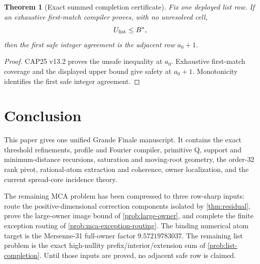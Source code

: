 \documentclass[11pt,a4paper]{amsart}
\numberwithin{equation}{section}
\newtheorem{theorem}{Theorem}[section]
\theoremstyle{remark}
\begin{document}
\begin{theorem}[Exact summed completion certificate]\label{thm:exact-completion-certificate}
Fix one deployed list row.  If an exhaustive first-match compiler proves, with no unresolved cell,
\[
 U_{\rm list}\le B^*,
\]
then the first safe integer agreement is the adjacent row $a_0+1$.
\end{theorem}

\begin{proof}
CAP25 v13.2 proves the unsafe inequality at $a_0$.  Exhaustive first-match coverage and the displayed upper bound give safety at $a_0+1$.  Monotonicity identifies the first safe integer agreement.
\end{proof}

\section{Conclusion}\label{sec:conclusion}
This paper gives one unified Grande Finale manuscript.  It contains the exact threshold refinements, profile and Fourier compiler, primitive Q, support and minimum-distance recursions, saturation and moving-root geometry, the order-$32$ rank pivot, rational-atom extraction and coherence, owner localization, and the current spread-core incidence theory.

The remaining MCA problem has been compressed to three row-sharp inputs: route the positive-dimensional correction components isolated by \cref{thm:residual}, prove the large-owner image bound of \cref{prob:large-owner}, and complete the finite exception routing of \cref{prob:mca-exception-routing}.  The binding numerical atom target is the Mersenne-31 full-owner factor $9.57219783037$.  The remaining list problem is the exact high-nullity prefix/interior/extension sum of \cref{prob:list-completion}.  Until those inputs are proved, no adjacent safe row is claimed.
\end{document}
